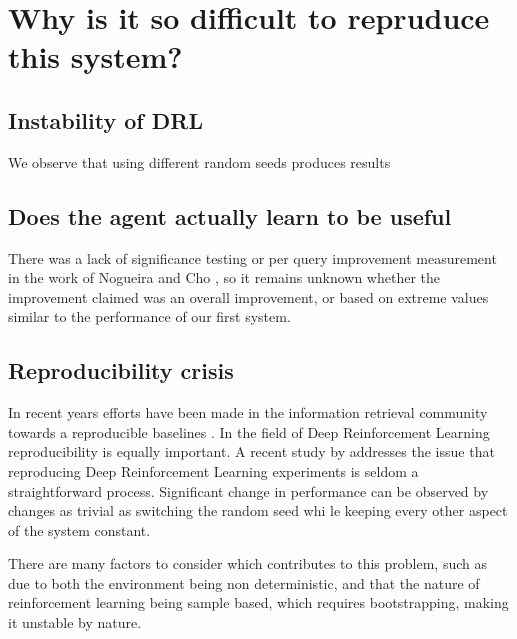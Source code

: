 \section{Why is it so difficult to repruduce this system?}
\subsection{Instability of DRL}

We observe that using different random seeds produces results 



\subsection{Does the agent actually learn to be useful}

There was a lack of significance testing or per query improvement measurement in the work of Nogueira and Cho \cite{nogueira2017task}, so it remains unknown whether the improvement claimed was an overall improvement, or based on extreme values similar to the performance of our first system.



\subsection{Reproducibility crisis}

In recent years efforts have been made in the information retrieval community towards a reproducible baselines \cite{lin2016toward}. In the field of Deep Reinforcement Learning reproducibility is equally important. A recent study by \cite{henderson2017deep} addresses the issue that reproducing Deep Reinforcement Learning experiments is seldom a straightforward process. Significant change in performance can be observed by changes as trivial as switching the random seed whi	le keeping every other aspect of the system constant.

There are many factors to consider which contributes to this problem, such as  due to both the environment being non deterministic, and that the nature of reinforcement learning being sample based, which requires bootstrapping, making it unstable by nature.




